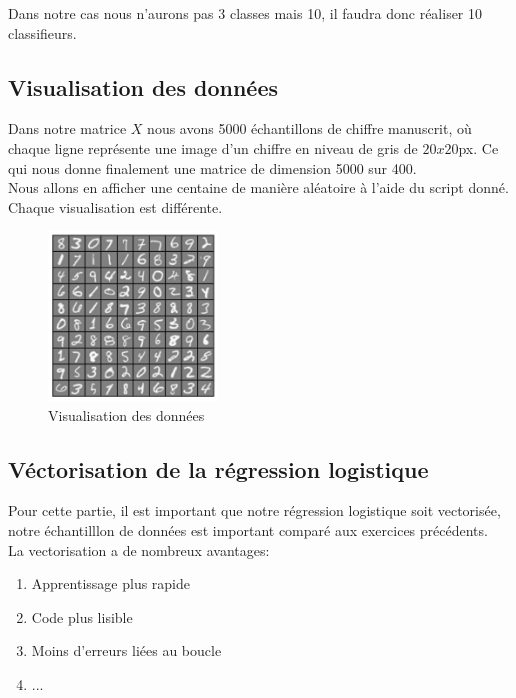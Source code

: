 \noindent
Dans notre cas nous n'aurons pas 3 classes mais 10, il faudra donc réaliser 10 classifieurs.

\subsection{Visualisation des données}

Dans notre matrice $X$ nous avons 5000 échantillons de chiffre manuscrit, où chaque ligne représente une image d'un chiffre en niveau de gris de $20x20$px. Ce qui nous donne finalement une matrice de dimension 
5000 sur 400. \\
Nous allons en afficher une centaine de manière aléatoire à l'aide du script donné. Chaque visualisation est différente.

\begin{figure}[!h]
    \begin{center}
        \includegraphics[width=0.4\textwidth]{./img/5.2.png}
        \caption{\label{fig:5.2}Visualisation des données}  
    \end{center}
\end{figure}

\clearpage
\subsection{Véctorisation de la régression logistique}

Pour cette partie, il est important que notre régression logistique soit vectorisée, notre échantilllon de données est important comparé aux exercices précédents. \\
La vectorisation a de nombreux avantages:

\begin{enumerate}
    \item Apprentissage plus rapide
    \item Code plus lisible
    \item Moins d'erreurs liées au boucle
    \item ...
\end{enumerate}

